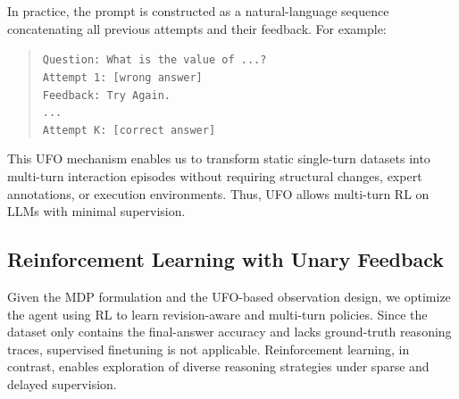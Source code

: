 In practice, the prompt is constructed as a natural-language sequence concatenating all previous attempts and their feedback. For example:
\begin{quote}
\small
\texttt{Question: What is the value of ...? \\
Attempt 1: [wrong answer] \\
Feedback: Try Again. \\
...\\
Attempt K: [correct answer]}
\end{quote}

This UFO mechanism enables us to transform static single-turn datasets into multi-turn interaction episodes without requiring structural changes, expert annotations, or execution environments. Thus, UFO allows multi-turn RL on LLMs with minimal supervision.

\subsection{Reinforcement Learning with Unary Feedback}

Given the MDP formulation and the UFO-based observation design, we optimize the agent using RL to learn revision-aware and multi-turn policies. Since the dataset only contains the final-answer accuracy and lacks ground-truth reasoning traces, supervised finetuning is not applicable. Reinforcement learning, in contrast, enables exploration of diverse reasoning strategies under sparse and delayed supervision.

